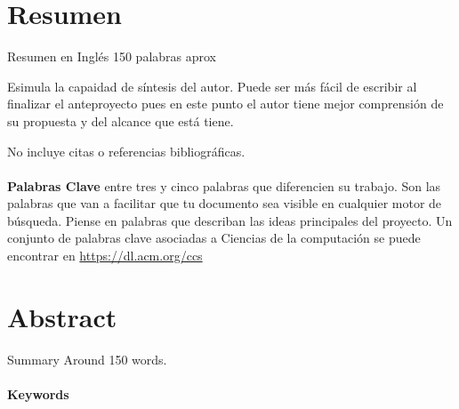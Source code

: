 
\section*{Resumen}
Resumen en Inglés
150 palabras aprox

Esimula la capaidad de síntesis del autor. Puede ser más fácil de escribir al finalizar el anteproyecto pues en este punto el autor tiene mejor comprensión de su propuesta y del alcance que está tiene. 

No incluye citas o referencias bibliográficas.


\paragraph*{}{\textbf{Palabras Clave}}
entre tres y cinco palabras que diferencien su trabajo. Son las palabras que van a facilitar que tu documento sea visible en cualquier motor de búsqueda. Piense en palabras que describan las ideas principales del proyecto. Un conjunto de palabras clave asociadas a Ciencias de la computación se puede encontrar en \url{https://dl.acm.org/ccs}
\section*{Abstract}
Summary 
Around 150 words. 
\paragraph*{}{\textbf{Keywords}}
